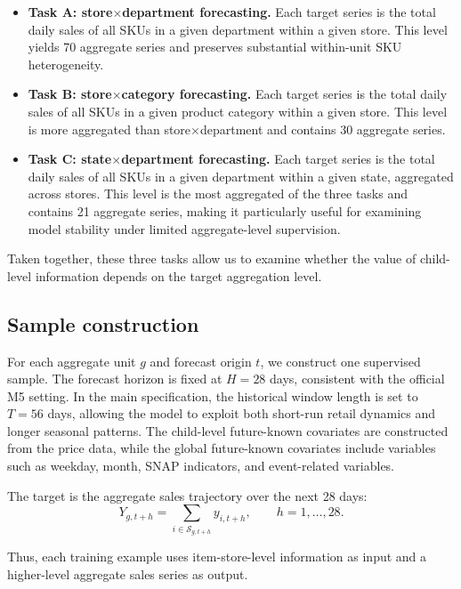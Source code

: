 \documentclass[12pt]{article}
\begin{document}
\begin{itemize}
  \item \textbf{Task A: store$\times$department forecasting.}
        Each target series is the total daily sales of all SKUs in a given department within a given store. This level yields 70 aggregate series and preserves substantial within-unit SKU heterogeneity.

  \item \textbf{Task B: store$\times$category forecasting.}
        Each target series is the total daily sales of all SKUs in a given product category within a given store. This level is more aggregated than store$\times$department and contains 30 aggregate series.

  \item \textbf{Task C: state$\times$department forecasting.}
        Each target series is the total daily sales of all SKUs in a given department within a given state, aggregated across stores. This level is the most aggregated of the three tasks and contains 21 aggregate series, making it particularly useful for examining model stability under limited aggregate-level supervision.
\end{itemize}

Taken together, these three tasks allow us to examine whether the value of child-level information depends on the target aggregation level.

\subsection{Sample construction}

For each aggregate unit $g$ and forecast origin $t$, we construct one supervised sample. The forecast horizon is fixed at $H=28$ days, consistent with the official M5 setting. In the main specification, the historical window length is set to $T=56$ days, allowing the model to exploit both short-run retail dynamics and longer seasonal patterns. The child-level future-known covariates are constructed from the price data, while the global future-known covariates include variables such as weekday, month, SNAP indicators, and event-related variables.

The target is the aggregate sales trajectory over the next 28 days:
\begin{equation}
  Y_{g,t+h}
  =
  \sum_{i \in \mathcal{S}_{g,t+h}} y_{i,t+h},
  \qquad h=1,\dots,28.
\end{equation}

Thus, each training example uses item-store-level information as input and a higher-level aggregate sales series as output.
\end{document}
